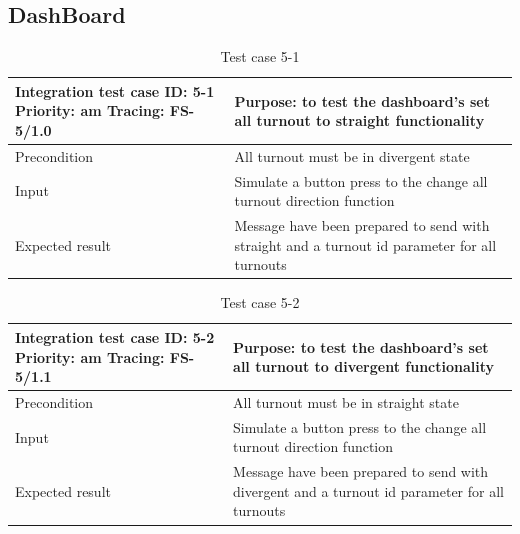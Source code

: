 \subsection{DashBoard}
\begin{table}[H]
	\caption{Test case 5-1}
	\label{table:TCase-FS5-1}
	\begin{center}
		\renewcommand{\arraystretch}{1.8}
		\begin{tabu} 
			to 0.9 \textwidth
			{  X[0.4, c] X[c] }
			\toprule
			Integration test case ID: 5-1 \newline Priority: am \newline Tracing: FS-5/1.0 & Purpose: to test the dashboard's set all turnout to straight functionality                   \\ \midrule
			Precondition                                                                   & All turnout must be in divergent state                                                       \\
			Input                                                                          & Simulate a button press to the change all turnout direction function                         \\
			Expected result                                                                & Message have been prepared to send with straight and a turnout id parameter for all turnouts \\ \bottomrule
		\end{tabu}
	\end{center}
\end{table}

\begin{table}[H]
	\caption{Test case 5-2}
	\label{table:TCase-FS5-2}
	\begin{center}
		\renewcommand{\arraystretch}{1.8}
		\begin{tabu} 
			to 0.9 \textwidth
			{  X[0.4, c] X[c] }
			\toprule
			Integration test case ID: 5-2 \newline Priority: am \newline Tracing: FS-5/1.1 & Purpose: to test the dashboard's set all turnout to divergent functionality                   \\ \midrule
			Precondition                                                                   & All turnout must be in straight state                                                         \\
			Input                                                                          & Simulate a button press to the change all turnout direction function                          \\
			Expected result                                                                & Message have been prepared to send with divergent and a turnout id parameter for all turnouts \\ \bottomrule
		\end{tabu}
	\end{center}
\end{table}

